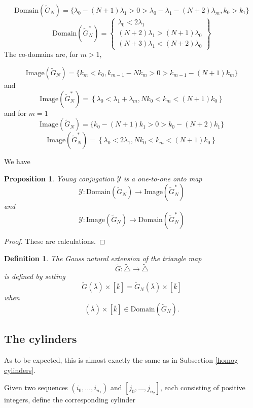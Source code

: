 \documentclass[12pt,oneside,openany]{article}
\newtheorem{prop}[theorem]{Proposition}
\newtheorem{definition}[theorem]{Definition}
\begin{document}
$$ \mbox{Domain}(\tilde{G}_N)  = \{ \lambda_0 - (N+1) \lambda_1 >0 >  \lambda_0 - \lambda_1 -(N+2)  \lambda_m, k_0>k_1   \}  $$
$$\mbox{Domain}(\tilde{G}_N^*)  =   \left\{  \begin{matrix} \lambda_0 < 2\lambda_1 \\
 (N+2) \lambda_1 > (N+1)\lambda_0 \\
(N+3) \lambda_1 < (N+2) \lambda_0\end{matrix} \right\}
 $$
 The co-domains are, 
 for $m>1$, 


$$\mbox{Image}(\tilde{G}_N)  = \{ k_m < k_0, k_{m-1} - Nk_m >0 >  k_{m-1} - (N+1)k_m \} $$
and
$$
\mbox{Image}(\tilde{G}_N^*)  = \left\{ \lambda_0 < \lambda_1 + \lambda_m, Nk_0 < k_m < (N+1) k_0\right\} 
 $$
and for $m=1$
 $$
\mbox{Image}(\tilde{G}_N)  = \{ k_0- (N+1)k_1>0 > k_0- (N+2)k_1  \}  $$
$$\mbox{Image}(\tilde{G}_N^*)  = \left\{\lambda_0 < 2 \lambda_1,  Nk_0 < k_m < (N+1) k_0   \right\}
 $$

  
We have 
\begin{prop} Young conjugation $\mathcal{Y}$ is a one-to-one onto map
$$\mathcal{Y}:    \mbox{Domain}(\tilde{G}_N) \rightarrow   \mbox{Image}(\tilde{G}_N^*) $$
and
$$\mathcal{Y}:    \mbox{Image}(\tilde{G}_N) \rightarrow   \mbox{Domain}(\tilde{G}_N^*) $$
\end{prop}

\begin{proof}These are calculations.
\end{proof}


\begin{definition}
The Gauss natural extension of  the triangle map 
$$\tilde{G}: \tilde{\triangle} \rightarrow \tilde{\triangle} $$
is defined  by setting
$$\tilde{G} (\overline{\lambda} )\times [ \overline{k} ] = \tilde{G}_N (\overline{\lambda} )\times [ \overline{k} ] $$
when
$$(\overline{\lambda} )\times [ \overline{k} ] \in  \mbox{Domain}(\tilde{G}_N) .$$
\end{definition}




\subsection{The cylinders}\label{fast homog cylinders}
As to be expected, this is almost exactly the same as in Subsection \ref{homog cylinders}.


Given two sequences $(i_0, \ldots, i_{n_1})$ and $[j_0, \ldots, j_{n_2}]$, each consisting of positive integers,  define the corresponding  cylinder 
\end{document}
